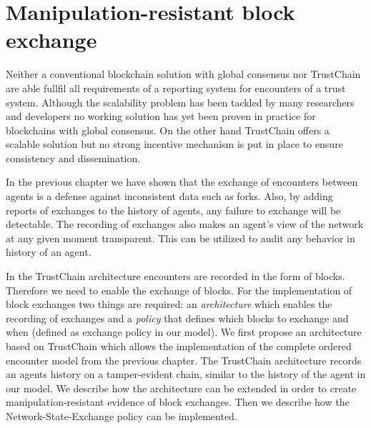 \chapter{Manipulation-resistant block exchange}
\label{sec:extension}
Neither a conventional blockchain solution with global consensus nor TrustChain are able fullfil all
requirements of a reporting system for encounters of a trust system. Although the scalability 
problem has been tackled by many researchers and developers\cite{poon2016bitcoin, luu2016secure}
no working solution has yet been proven in practice for blockchains with global consensus. On the 
other hand TrustChain offers a scalable solution but no strong incentive mechanism is put in place to 
ensure consistency and dissemination. 

In the previous chapter we have shown that the exchange of encounters between agents is a defense 
against inconsistent data such as forks. Also, by adding reports of exchanges to the history of 
agents, any failure to exchange will be detectable. The recording of exchanges also makes an agent's
view of the network at any given moment transparent. This can be utilized to audit any behavior in 
history of an agent.

In the TrustChain architecture encounters are recorded in the form of blocks. Therefore we need to 
enable the exchange of blocks. For the implementation of block exchanges two things are required: an \textit{architecture} which enables the 
recording of exchanges and a \textit{policy} that defines which blocks to exchange and when (defined as exchange policy in 
our model). We first propose an architecture based on TrustChain which allows the implementation 
of the complete ordered encounter model from the previous chapter. The TrustChain architecture 
records an agents history on a tamper-evident chain, similar to the history of the agent in our 
model. We describe how the architecture can be extended in order to create manipulation-resistant 
evidence of block exchanges. Then we describe how the Network-State-Exchange policy can be implemented.

